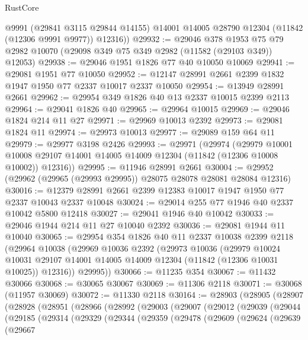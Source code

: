 \begin{lexlean}{RustCore}
\begin{coremodule}
        @9991
        (@29841 @3115 @29844 @14155)
        @14001
        @14005
        @28790
        @12304
        (@11842 (@12306 @9991 @9977))
        @12316))
@29932 := @29046
    @378
    @1953
    @75
    @79
    @2982
    @10070
    (@29098 @349 @75 @349 @2982 (@11582 (@29103 @349)) @12053)
@29938 := @29046 @1951 @1826 @77 @40 @10050 @10069
@29941 := @29081 @1951 @77 @10050
@29952 := @12147 @28991 @2661 @2399 @1832 @1947 @1950 @77 @2337 @10017 @2337 @10050
@29954 := @13949 @28991 @2661
@29962 := @29954 @349 @1826 @40 @13 @2337 @10015 @2399 @2113
@29964 := @29041 @1826 @40
@29965 := @29964 @10015
@29969 := @29046 @1824 @214 @11 @27
@29971 := @29969 @10013 @2392
@29973 := @29081 @1824 @11
@29974 := @29973 @10013
@29977 := @29089 @159 @64 @11
@29979 := @29977 @3198 @2426
@29993 := @29971
    (@29974
      (@29979
        @10001
        @10008
        @29107
        @14001
        @14005
        @14009
        @12304
        (@11842 (@12306 @10008 @10002))
        @12316))
@29995 := @11946 @28991 @2661
@30004 := @29952 (@29962 (@29965 (@29993 @29995)) @28075 @28078 @28081 @28084 @12316)
@30016 := @12379 @28991 @2661 @2399 @12383 @10017 @1947 @1950 @77 @2337 @10043 @2337 @10048
@30024 := @29014 @255 @77 @1946 @40 @2337 @10042 @5800 @12418
@30027 := @29041 @1946 @40 @10042
@30033 := @29046 @1944 @214 @11 @27 @10040 @2392
@30036 := @29081 @1944 @11 @10040
@30065 := @29954
    @354
    @1826
    @40
    @11
    @2337
    @10038
    @2399
    @2118
    (@29964
      @10038
      (@29969
        @10036
        @2392
        (@29973
          @10036
          (@29979
            @10024
            @10031
            @29107
            @14001
            @14005
            @14009
            @12304
            (@11842 (@12306 @10031 @10025))
            @12316))
        @29995))
@30066 := @11235 @354
@30067 := @11432 @30066
@30068 := @30065 @30067
@30069 := @11306 @2118
@30071 := @30068 (@11957 @30069)
@30072 := @11330 @2118
@30164 := @28903
    (@28905
      (@28907
        (@28928
          (@28951
            (@28966
              (@28992
                (@29003
                  (@29007
                    (@29012
                      (@29039
                        (@29044
                          (@29185
                            (@29314
                              (@29329
                                (@29344
                                  (@29359
                                    (@29478
                                      (@29609
                                        (@29624
                                          (@29639
                                            (@29667

\end{coremodule}
\end{lexlean}
